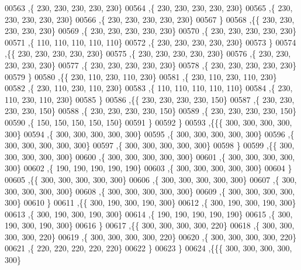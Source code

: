 \begin{DoxyCode}
00563    ,\{   230,   230,   230,   230,   230\}
00564    ,\{   230,   230,   230,   230,   230\}
00565    ,\{   230,   230,   230,   230,   230\}
00566    ,\{   230,   230,   230,   230,   230\}
00567    \}
00568   ,\{\{   230,   230,   230,   230,   230\}
00569    ,\{   230,   230,   230,   230,   230\}
00570    ,\{   230,   230,   230,   230,   230\}
00571    ,\{   110,   110,   110,   110,   110\}
00572    ,\{   230,   230,   230,   230,   230\}
00573    \}
00574   ,\{\{   230,   230,   230,   230,   230\}
00575    ,\{   230,   230,   230,   230,   230\}
00576    ,\{   230,   230,   230,   230,   230\}
00577    ,\{   230,   230,   230,   230,   230\}
00578    ,\{   230,   230,   230,   230,   230\}
00579    \}
00580   ,\{\{   230,   110,   230,   110,   230\}
00581    ,\{   230,   110,   230,   110,   230\}
00582    ,\{   230,   110,   230,   110,   230\}
00583    ,\{   110,   110,   110,   110,   110\}
00584    ,\{   230,   110,   230,   110,   230\}
00585    \}
00586   ,\{\{   230,   230,   230,   230,   150\}
00587    ,\{   230,   230,   230,   230,   150\}
00588    ,\{   230,   230,   230,   230,   150\}
00589    ,\{   230,   230,   230,   230,   150\}
00590    ,\{   150,   150,   150,   150,   150\}
00591    \}
00592   \}
00593  ,\{\{\{   300,   300,   300,   300,   300\}
00594    ,\{   300,   300,   300,   300,   300\}
00595    ,\{   300,   300,   300,   300,   300\}
00596    ,\{   300,   300,   300,   300,   300\}
00597    ,\{   300,   300,   300,   300,   300\}
00598    \}
00599   ,\{\{   300,   300,   300,   300,   300\}
00600    ,\{   300,   300,   300,   300,   300\}
00601    ,\{   300,   300,   300,   300,   300\}
00602    ,\{   190,   190,   190,   190,   190\}
00603    ,\{   300,   300,   300,   300,   300\}
00604    \}
00605   ,\{\{   300,   300,   300,   300,   300\}
00606    ,\{   300,   300,   300,   300,   300\}
00607    ,\{   300,   300,   300,   300,   300\}
00608    ,\{   300,   300,   300,   300,   300\}
00609    ,\{   300,   300,   300,   300,   300\}
00610    \}
00611   ,\{\{   300,   190,   300,   190,   300\}
00612    ,\{   300,   190,   300,   190,   300\}
00613    ,\{   300,   190,   300,   190,   300\}
00614    ,\{   190,   190,   190,   190,   190\}
00615    ,\{   300,   190,   300,   190,   300\}
00616    \}
00617   ,\{\{   300,   300,   300,   300,   220\}
00618    ,\{   300,   300,   300,   300,   220\}
00619    ,\{   300,   300,   300,   300,   220\}
00620    ,\{   300,   300,   300,   300,   220\}
00621    ,\{   220,   220,   220,   220,   220\}
00622    \}
00623   \}
00624  ,\{\{\{   300,   300,   300,   300,   300\}

\end{DoxyCode}
